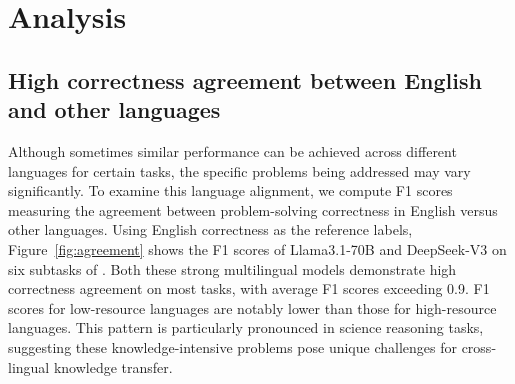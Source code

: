 \section{Analysis}
\subsection{High correctness agreement between English and other languages}
Although sometimes similar performance can be achieved across different languages for certain tasks, the specific problems being addressed may vary significantly.
To examine this language alignment, we compute F1 scores measuring the agreement between problem-solving correctness in English versus other languages.
Using English correctness as the reference labels, Figure~\ref{fig:agreement} shows the F1 scores of Llama3.1-70B and DeepSeek-V3 on six subtasks of \name.
Both these strong multilingual models demonstrate high correctness agreement on most tasks, with average F1 scores exceeding 0.9.
F1 scores for low-resource languages are notably lower than those for high-resource languages.
This pattern is particularly pronounced in science reasoning tasks, suggesting these knowledge-intensive problems pose unique challenges for cross-lingual knowledge transfer.



